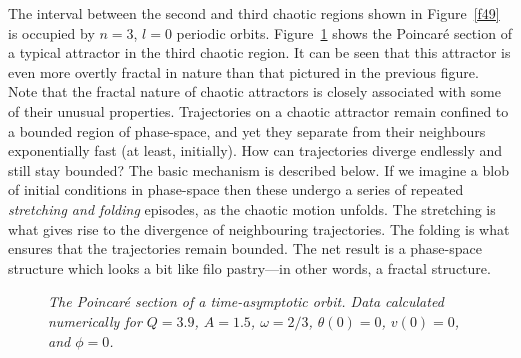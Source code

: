 The interval between the second and third chaotic regions shown in Figure~\ref{f49} is
occupied by $n=3$, $l=0$ periodic orbits. Figure~\ref{f52} shows the Poincar\'{e} section 
of a typical attractor in the
third chaotic region. It can be seen that this attractor is even more overtly fractal
in nature than that pictured in the previous figure. Note that the fractal nature
of chaotic attractors is closely associated with some of their  unusual properties. 
Trajectories on a chaotic attractor remain confined to a bounded region of phase-space,
and yet they separate from their neighbours exponentially fast (at least, initially).
How can trajectories diverge endlessly and still stay bounded? The basic mechanism
is described below.
If we imagine
a blob of initial conditions in phase-space then these undergo a series of
repeated {\em stretching and folding}\/ episodes, as the chaotic motion unfolds. The stretching is
what gives rise to the divergence of neighbouring trajectories. The folding is what ensures that
the trajectories remain bounded. 
The net
result is a phase-space structure which looks  a bit like filo pastry---in other words, a fractal
structure. 

\begin{figure}
\epsfysize=3in
\centerline{}
\caption{\em The Poincar\'{e} section of a time-asymptotic
orbit. Data  calculated numerically for $Q=3.9$, $A=1.5$, $\omega=2/3$, $\theta(0)=0$,
$v(0)=0$,  and $\phi=0$. }\label{f52}
\end{figure}
